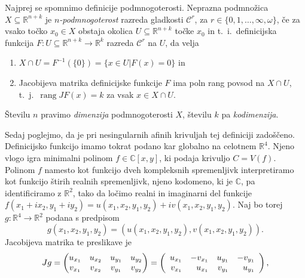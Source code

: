 \documentclass[mat1]{fmfdelo}
\newcommand{\tikzmark}[1]{\tikz[overlay,remember picture,baseline=(#1.base)]
  \node (#1) {\strut};}
\newcommand{\R}{\mathbb R}
\newcommand{\C}{\mathbb C}
\DeclareMathOperator{\rang}{rang}
\theoremstyle{definition}
\begin{document}
\begin{dokaz}
    Najprej se spomnimo definicije podmnogoterosti. Neprazna podmnožica $X \subseteq \R^{n+k}$ je \emph{$n$-podmnogoterost} razreda gladkosti $\mathcal{C}^r$, za $r \in \{0,1,\dots, \infty, \omega\}$, če za vsako točko $x_0 \in X$ obstaja okolica $U \subseteq \R^{n+k}$ točke $x_0$ in t.~i.\ definicijska funkcija $F: U \subseteq \R^{n+k} \to \R^k$ razreda $\mathcal{C}^r$ na $U$, da velja
    \begin{enumerate}
        \item $X \cap U = F^{-1}(\{0\}) = \{x \in U | F(x) = 0\}$ in
        \item Jacobijeva matrika definicijske funkcije $F$ ima poln rang povsod na $X \cap U$, t.~j.\  $\rang J F(x) = k$ za vsak $x \in X \cap U$.
    \end{enumerate}
    Številu $n$ pravimo \emph{dimenzija} podmnogoterosti $X$, številu $k$ pa \emph{kodimenzija}.
    \\
    \par
    Sedaj poglejmo, da je pri nesingularnih afinih krivuljah tej definiciji zadoščeno. Definicijsko funkcijo imamo tokrat podano kar globalno na celotnem $\R^4$. Njeno vlogo igra minimalni polinom $f \in \C[x,y]$, ki podaja krivuljo $C = V(f)$. Polinom $f$ namesto kot funkcijo dveh kompleksnih spremenljivk interpretiramo kot funkcijo štirih realnih spremenljivk, njeno kodomeno, ki je $\C$, pa identificiramo z $\R^2$, tako da ločimo realni in imaginarni del funkcije $f(x_1 + ix_2, y_1 + iy_2) = u(x_1,x_2,y_1,y_2) + iv(x_1,x_2,y_1,y_2)$. Naj bo torej $g: \R^4 \to \R^2$ podana s predpisom
    \[
        g(x_1,x_2,y_1,y_2) = (u(x_1,x_2,y_1,y_2), v(x_1,x_2,y_1,y_2)).
    \]
    Jacobijeva matrika te preslikave je
    \[
    Jg = 
    \begin{pmatrix}
        u_{x_1} & u_{x_2} & u_{y_1} & u_{y_2} \\
        v_{x_1} & v_{x_2} & v_{y_1} & v_{y_2}
    \end{pmatrix}
    =
    \left (
        \begin{array}{rrrr}
            u_{x_1} & -v_{x_1} & u_{y_1} & -v_{y_1} \\
            \tikzmark{lower1} v_{x_1} & u_{x_1}\tikzmark{lower2} & \tikzmark{lower3} v_{y_1} & u_{y_1} \tikzmark{lower4}\\
        \end{array}
    \right ),
    \]
        

\end{dokaz}
\end{document}
